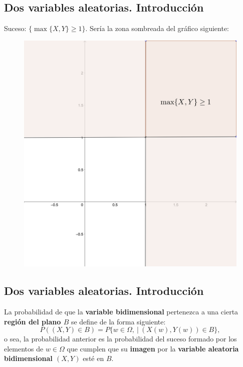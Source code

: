 \documentclass[]{book}
\begin{document}
\hypertarget{dos-variables-aleatorias.-introducciuxf3n-2}{%
\subsection{Dos variables aleatorias. Introducción}\label{dos-variables-aleatorias.-introducciuxf3n-2}}

Suceso: \(\{\max\{X,Y\}\geq 1\}\). Sería la zona sombreada del gráfico siguiente:

\begin{figure}
\includegraphics[width=450px]{Images/Bidim3} \end{figure}

\hypertarget{dos-variables-aleatorias.-introducciuxf3n-3}{%
\subsection{Dos variables aleatorias. Introducción}\label{dos-variables-aleatorias.-introducciuxf3n-3}}

La probabilidad de que la \textbf{variable bidimensional} pertenezca a una cierta \textbf{región del plano \(B\)} se define de la forma siguiente:
\[
P((X,Y)\in B)=P\{w\in \Omega,\ |\ (X(w),Y(w))\in B\},
\]
o sea, la probabilidad anterior es la probabilidad del suceso formado por los elementos de \(w\in\Omega\) que cumplen que su \textbf{imagen} por la \textbf{variable aleatoria bidimensional \((X,Y)\)} esté en \(B\).
\end{document}
